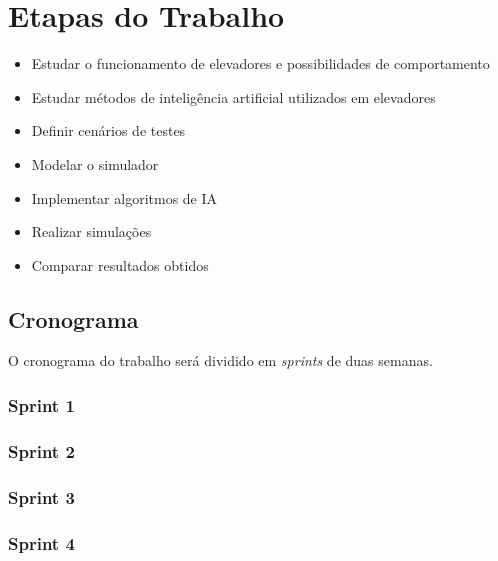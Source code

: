 \chapter{\label{chap:stages}Etapas do Trabalho}

\begin{itemize}
    \item Estudar o funcionamento de elevadores e possibilidades de comportamento
    \item Estudar métodos de inteligência artificial utilizados em elevadores
    \item Definir cenários de testes
    \item Modelar o simulador
    \item Implementar algoritmos de IA
    \item Realizar simulações
    \item Comparar resultados obtidos
\end{itemize}

\section{Cronograma}

O cronograma do trabalho será dividido em \textit{sprints} de duas semanas. 

\subsection{Sprint 1}
\subsection{Sprint 2}
\subsection{Sprint 3}
\subsection{Sprint 4}